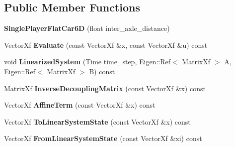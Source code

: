 \subsection*{Public Member Functions}
\begin{DoxyCompactItemize}
\item 
{\bfseries Single\+Player\+Flat\+Car6D} (float inter\+\_\+axle\+\_\+distance)\hypertarget{classilqgames_1_1_single_player_flat_car6_d_a9fb4fd8e7be90858f22bc536a7bd3222}{}\label{classilqgames_1_1_single_player_flat_car6_d_a9fb4fd8e7be90858f22bc536a7bd3222}

\item 
Vector\+Xf {\bfseries Evaluate} (const Vector\+Xf \&x, const Vector\+Xf \&u) const \hypertarget{classilqgames_1_1_single_player_flat_car6_d_ab1e6af4ef47c00b30ec12420e9691b52}{}\label{classilqgames_1_1_single_player_flat_car6_d_ab1e6af4ef47c00b30ec12420e9691b52}

\item 
void {\bfseries Linearized\+System} (Time time\+\_\+step, Eigen\+::\+Ref$<$ Matrix\+Xf $>$ A, Eigen\+::\+Ref$<$ Matrix\+Xf $>$ B) const \hypertarget{classilqgames_1_1_single_player_flat_car6_d_a2575a1cd3ded4ccd4aea97062a31ba21}{}\label{classilqgames_1_1_single_player_flat_car6_d_a2575a1cd3ded4ccd4aea97062a31ba21}

\item 
Matrix\+Xf {\bfseries Inverse\+Decoupling\+Matrix} (const Vector\+Xf \&x) const \hypertarget{classilqgames_1_1_single_player_flat_car6_d_a236f5a1d6fd3d2d1cb11f4b468efc981}{}\label{classilqgames_1_1_single_player_flat_car6_d_a236f5a1d6fd3d2d1cb11f4b468efc981}

\item 
Vector\+Xf {\bfseries Affine\+Term} (const Vector\+Xf \&x) const \hypertarget{classilqgames_1_1_single_player_flat_car6_d_a662f412d3214b61a99583f2a21647423}{}\label{classilqgames_1_1_single_player_flat_car6_d_a662f412d3214b61a99583f2a21647423}

\item 
Vector\+Xf {\bfseries To\+Linear\+System\+State} (const Vector\+Xf \&x) const \hypertarget{classilqgames_1_1_single_player_flat_car6_d_a514b9407d2e5d7697d366716d11b7d46}{}\label{classilqgames_1_1_single_player_flat_car6_d_a514b9407d2e5d7697d366716d11b7d46}

\item 
Vector\+Xf {\bfseries From\+Linear\+System\+State} (const Vector\+Xf \&xi) const \hypertarget{classilqgames_1_1_single_player_flat_car6_d_a3526acc25cf14c614fdf5b3d8590f269}{}\label{classilqgames_1_1_single_player_flat_car6_d_a3526acc25cf14c614fdf5b3d8590f269}


\end{DoxyCompactItemize}
